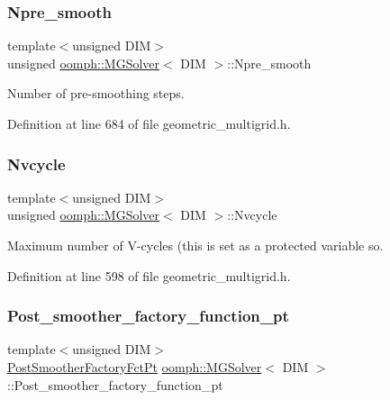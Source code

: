 \subsubsection{\texorpdfstring{Npre\+\_\+smooth}{Npre\_smooth}}
{\footnotesize\ttfamily template$<$unsigned D\+IM$>$ \\
unsigned \hyperlink{classoomph_1_1MGSolver}{oomph\+::\+M\+G\+Solver}$<$ D\+IM $>$\+::Npre\+\_\+smooth\hspace{0.3cm}{\ttfamily [private]}}



Number of pre-\/smoothing steps. 



Definition at line 684 of file geometric\+\_\+multigrid.\+h.

\mbox{\label{classoomph_1_1MGSolver_ab3d4af8ea6d7bc8d0a6f528cb669e920}} 
\subsubsection{\texorpdfstring{Nvcycle}{Nvcycle}}
{\footnotesize\ttfamily template$<$unsigned D\+IM$>$ \\
unsigned \hyperlink{classoomph_1_1MGSolver}{oomph\+::\+M\+G\+Solver}$<$ D\+IM $>$\+::Nvcycle\hspace{0.3cm}{\ttfamily [protected]}}



Maximum number of V-\/cycles (this is set as a protected variable so. 



Definition at line 598 of file geometric\+\_\+multigrid.\+h.

\mbox{\label{classoomph_1_1MGSolver_a2c105a6889f43968c9e57366f44ebd79}} 
\subsubsection{\texorpdfstring{Post\+\_\+smoother\+\_\+factory\+\_\+function\+\_\+pt}{Post\_smoother\_factory\_function\_pt}}
{\footnotesize\ttfamily template$<$unsigned D\+IM$>$ \\
\hyperlink{classoomph_1_1MGSolver_a72fa4eb80c0b5a0ec6811dcd92b30231}{Post\+Smoother\+Factory\+Fct\+Pt} \hyperlink{classoomph_1_1MGSolver}{oomph\+::\+M\+G\+Solver}$<$ D\+IM $>$\+::Post\+\_\+smoother\+\_\+factory\+\_\+function\+\_\+pt\hspace{0.3cm}{\ttfamily [private]}}



